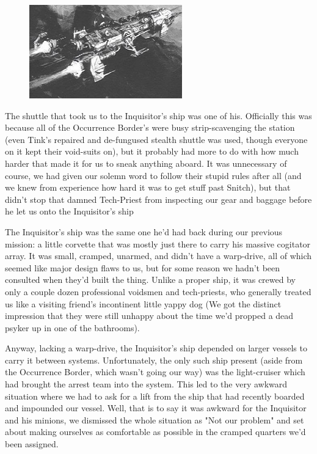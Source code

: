\begin{figure}
	\begin{center}
		\includegraphics[width=\figwidth]{pics/17/20.png}
	\end{center}
\end{figure}
The shuttle that took us to the Inquisitor's ship was one of his. 
Officially this was because all of the Occurrence Border's were busy strip-scavenging the station (even Tink's repaired and de-fungused stealth shuttle was used, though everyone on it kept their void-suits on), but it probably had more to do with how much harder that made it for us to sneak anything aboard. 
It was unnecessary of course, we had given our solemn word to follow their stupid rules after all (and we knew from experience how hard it was to get stuff past Snitch), but that didn't stop that damned Tech-Priest from inspecting our gear and baggage before he let us onto the Inquisitor's ship

The Inquisitor's ship was the same one he'd had back during our previous mission: 
a little corvette that was mostly just there to carry his massive cogitator array. 
It was small, cramped, unarmed, and didn't have a warp-drive, all of which seemed like major design flaws to us, but for some reason we hadn't been consulted when they'd built the thing. 
Unlike a proper ship, it was crewed by only a couple dozen professional voidsmen and tech-priests, who generally treated us like a visiting friend's incontinent little yappy dog (We got the distinct impression that they were still unhappy about the time we'd propped a dead psyker up in one of the bathrooms).

Anyway, lacking a warp-drive, the Inquisitor's ship depended on larger vessels to carry it between systems. 
Unfortunately, the only such ship present (aside from the Occurrence Border, which wasn't going our way) was the light-cruiser which had brought the arrest team into the system. 
This led to the very awkward situation where we had to ask for a lift from the ship that had recently boarded and impounded our vessel. 
Well, that is to say it was awkward for the Inquisitor and his minions, we dismissed the whole situation as "Not our problem" and set about making ourselves as comfortable as possible in the cramped quarters we'd been assigned.


